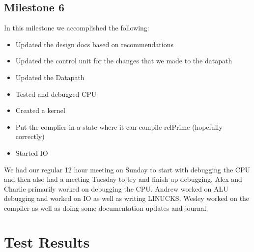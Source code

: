 \documentclass{report}
\begin{document}
	\section{Milestone 6}
		In this milestone we accomplished the following:
		\begin{itemize}
			\item Updated the design docs based on recommendations
			\item Updated the control unit for the changes that we made to the datapath
			\item Updated the Datapath
			\item Tested and debugged CPU
			\item Created a kernel
			\item Put the complier in a state where it can compile relPrime (hopefully correctly)
			\item Started IO
		\end{itemize}
		We had our regular 12 hour meeting on Sunday to start with debugging the CPU and then also had a meeting Tuesday to try and finish up debugging.  Alex and Charlie primarily worked on debugging the CPU.  Andrew worked on ALU debugging and worked on IO as well as writing LINUCKS.  Wesley worked on the compiler as well as doing some documentation updates and journal.
\chapter{Test Results}
\end{document}
